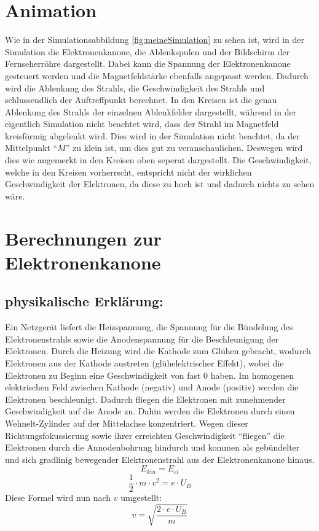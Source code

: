 \section{Animation}
Wie in der Simulationsabbildung \ref{fig:meineSimulation} zu sehen ist, wird in der Simulation die Elektronenkanone, die Ablenkspulen und der Bildschirm der Fernseherröhre dargestellt. 
Dabei kann die Spannung der Elektronenkanone gesteuert werden und die Magnetfeldstärke ebenfalls angepasst werden.
Dadurch wird die Ablenkung des Strahls, die Geschwindigkeit des Strahls und schlussendlich der Auftreffpunkt berechnet.
In den Kreisen ist die genau Ablenkung des Strahls der einzelnen Ablenkfelder dargestellt, während in der eigentlich Simulation nicht beachtet wird, dass der Strahl im Magnetfeld kreisförmig abgelenkt wird.
Dies wird in der Simulation nicht beachtet, da der Mittelpunkt "`$M$"' zu klein ist, um dies gut zu veranschaulichen.
Deswegen wird dies wie angemerkt in den Kreisen oben seperat dargestellt.
Die Geschwindigkeit, welche in den Kreisen vorherrscht, entspricht nicht der wirklichen Geschwindigkeit der Elektronen, da diese zu hoch ist und dadurch nichts zu sehen wäre.
\label{sec:animation}



\section{Berechnungen zur Elektronenkanone}

\subsection{physikalische Erklärung:}
\label{sec:tolle-section}
 
Ein Netzgerät liefert die Heizspannung, die Spannung für die Bündelung des Elektronenstrahls sowie die Anodenspannung für die Beschleunigung der Elektronen.
Durch die Heizung wird die Kathode zum Glühen gebracht, wodurch Elektronen aus der Kathode austreten (glühelektrischer Effekt), wobei die Elektronen zu Beginn eine Geschwindigkeit von fast $0$ haben.
Im homogenen elektrischen Feld zwischen Kathode (negativ) und Anode (positiv) werden die Elektronen beschleunigt.
Dadurch fliegen die Elektronen mit zunehmender Geschwindigkeit auf die Anode zu.
Dahin werden die Elektronen durch einen Wehnelt-Zylinder auf der Mittelachse konzentriert.
Wegen dieser Richtungsfokussierung sowie ihrer erreichten Geschwindigkeit "`fliegen"' die Elektronen durch die Annodenbohrung hindurch und kommen als gebündelter und sich gradlinig bewegender Elektronenstrahl aus der Elektronenkanone hinaus.
$$ E_{kin} = E_{el}$$
$$ \frac{1}{2} \cdot m \cdot v^2 = e \cdot U_B$$
Diese Formel wird  nun nach $v$ umgestellt:
\begin{equation}
\label{eq:v}
   v = \sqrt{\frac{2 \cdot e \cdot U_B}{m}} 
\end{equation}
$$ $$

